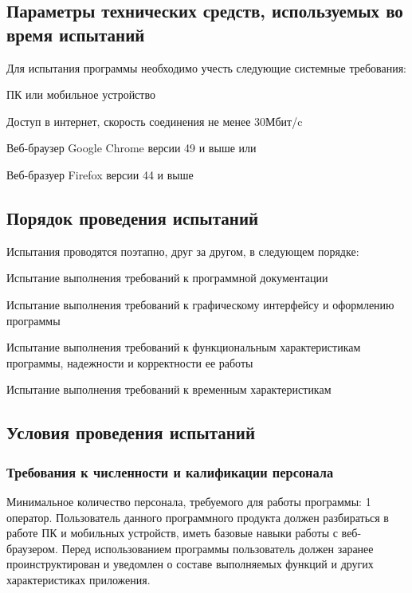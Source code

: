 \subsection{Параметры технических средств, используемых во время испытаний}
Для испытания программы необходимо учесть следующие системные требования:
\begin{my_enumerate}
  \item ПК или мобильное устройство
  \item Доступ в интернет, скорость соединения не менее 30Мбит/c
  \item Веб-браузер Google Chrome версии 49 и выше или
  \item Веб-бразуер Firefox версии 44 и выше
\end{my_enumerate}

\subsection{Порядок проведения испытаний}
Испытания проводятся поэтапно, друг за другом, в следующем порядке:
\begin{my_enumerate}
    \item Испытание выполнения требований к программной документации
    \item Испытание выполнения требований к графическому интерфейсу и оформлению программы
    \item Испытание выполнения требований к функциональным характеристикам программы, надежности и корректности ее работы
    \item Испытание выполнения требований к временным характеристикам
\end{my_enumerate}

\subsection{Условия проведения испытаний}

\subsubsection{Требования к численности и калификации персонала}
Минимальное количество персонала, требуемого для работы программы: 1 оператор.
Пользователь данного программного продукта должен разбираться в работе
ПК и мобильных устройств, иметь базовые навыки работы с веб-браузером.
Перед использованием программы пользователь должен заранее проинструктирован и
уведомлен о составе выполняемых функций и других характеристиках приложения.

